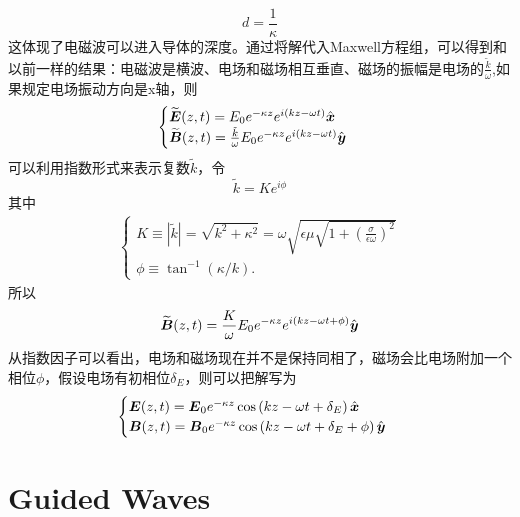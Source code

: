 \documentclass[14pt,oneside]{book}
\def \E{\vb*{E}}
\def \B{\vb*{B}}
\begin{document}
\begin{large}
\begin{equation}
  d=\frac{1}{\kappa}
\end{equation}
这体现了电磁波可以进入导体的深度。通过将解代入Maxwell方程组，可以得到和以前一样的结果：电磁波是横波、电场和磁场相互垂直、磁场的振幅是电场的$\frac{\tilde k}{\omega}$,如果规定电场振动方向是x轴，则
\begin{align}
\begin{cases}
		\widetilde{\vb*{E}}(z, t)={E}_0 e^{-\kappa z} e^{i(k z-\omega t)} \hat{\vb*{x}} \\
\widetilde{\vb*{B}}(z, t)=\frac{\tilde{k}}{\omega} E_0 e^{-\kappa z} e^{i(k z-\omega t)} \hat{\vb*{y}}
\end{cases}
\end{align}
可以利用指数形式来表示复数$\tilde{k}$，令
\begin{equation}
  \tilde{k}=Ke^{i\phi}
\end{equation}
其中
\begin{align}
\begin{cases}
K \equiv|\tilde{k}|=\sqrt{k^2+\kappa^2}=\omega \sqrt{\epsilon \mu \sqrt{1+\left(\frac{\sigma}{\epsilon \omega}\right)^2}} \\
\phi \equiv \tan ^{-1}(\kappa / k) .
\end{cases}
\end{align}
所以
\begin{equation}
  \widetilde{\vb*{B}}(z, t)=\frac{K}{\omega} E_0 e^{-\kappa z} e^{i(k z-\omega t+\phi)} \hat{\vb*{y}}
\end{equation}
从指数因子可以看出，电场和磁场现在并不是保持同相了，磁场会比电场附加一个相位$\phi$，假设电场有初相位$\delta_E$，则可以把解写为
\begin{align}
\begin{cases}
\vb*{E}(z, t)=\E_0 e^{-\kappa z} \cos \left(k z-\omega t+\delta_E\right) \hat{\vb*{x}} \\
\vb*{B}(z, t)=\B_0 e^{-\kappa z} \cos \left(k z-\omega t+\delta_E+\phi\right) \hat{\vb*{y}}
\end{cases}
\end{align}
\newpage
\section{Guided Waves}

\end{large}
\end{document}
